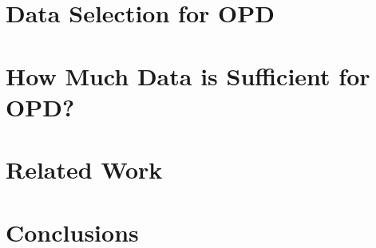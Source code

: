 \documentclass{article} %
\begin{document}
\section{Data Selection for OPD}  \label{sec:selection}


\section{How Much Data is Sufficient for OPD?}  \label{sec:analysis}


\section{Related Work}



\section{Conclusions} 





\appendix

\end{document}

